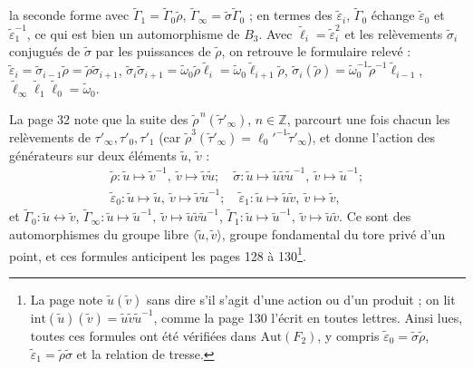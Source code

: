 \documentclass[11pt,a4paper]{article}
\begin{document}
la seconde forme avec $\tilde\Gamma_1 = \tilde\Gamma_0\tilde\rho$,
$\tilde\Gamma_\infty = \tilde\sigma\tilde\Gamma_0$ ; en termes des
$\tilde\varepsilon_i$, $\tilde\Gamma_0$ échange $\tilde\varepsilon_0$ et
$\tilde\varepsilon_1^{-1}$, ce qui est bien un automorphisme de $B_3$. Avec
$\tilde\ell_i = \tilde\varepsilon_i^2$ et les relèvements $\tilde\sigma_i$
conjugués de $\tilde\sigma$ par les puissances de $\tilde\rho$, on retrouve le
formulaire relevé :
$\tilde\varepsilon_i = \tilde\sigma_{i-1}\tilde\rho = \tilde\rho\tilde\sigma_{i+1}$,
$\tilde\sigma_i\tilde\sigma_{i+1} = \tilde\omega_0\tilde\rho\tilde\ell_i = \tilde\omega_0\tilde\ell_{i+1}\tilde\rho$,
$\tilde\sigma_i(\tilde\rho) = \tilde\omega_0^{-1}\tilde\rho^{-1}\tilde\ell_{i-1}$,
$\tilde\ell_\infty\tilde\ell_1\tilde\ell_0 = \tilde\omega_0$.

La page 32 note que la suite des $\tilde\rho^{\,n}(\tilde\tau'_\infty)$,
$n \in \mathbb{Z}$, parcourt une fois chacun les relèvements de
$\tau'_\infty, \tau'_0, \tau'_1$ (car $\tilde\rho^3(\tilde\tau'_\infty) = \ell_0'^{-1}\tilde\tau'_\infty$),
et donne l'action des générateurs sur deux éléments $\tilde u$, $\tilde v$ :
\[
\begin{gathered}
\tilde\rho : \tilde u \mapsto \tilde v^{-1},\ \tilde v \mapsto \tilde v\tilde u ; \quad
\tilde\sigma : \tilde u \mapsto \tilde u\tilde v\tilde u^{-1},\ \tilde v \mapsto \tilde u^{-1} ; \\
\tilde\varepsilon_0 : \tilde u \mapsto \tilde u,\ \tilde v \mapsto \tilde v\tilde u^{-1} ; \quad
\tilde\varepsilon_1 : \tilde u \mapsto \tilde u\tilde v,\ \tilde v \mapsto \tilde v,
\end{gathered}
\]
et $\tilde\Gamma_0 : \tilde u \leftrightarrow \tilde v$,
$\tilde\Gamma_\infty : \tilde u \mapsto \tilde u^{-1},\ \tilde v \mapsto \tilde u\tilde v\tilde u^{-1}$,
$\tilde\Gamma_1 : \tilde u \mapsto \tilde u^{-1},\ \tilde v \mapsto \tilde u\tilde v$.
Ce sont des automorphismes du groupe libre $\langle \tilde u, \tilde v \rangle$,
groupe fondamental du tore privé d'un point, et ces formules anticipent les
pages 128 à 130\footnote{La page note $\tilde u(\tilde v)$ sans dire s'il s'agit
d'une action ou d'un produit ; on lit
$\mathrm{int}(\tilde u)(\tilde v) = \tilde u\tilde v\tilde u^{-1}$, comme la
page 130 l'écrit en toutes lettres. Ainsi lues, toutes ces formules ont été
vérifiées dans $\mathrm{Aut}(F_2)$, y compris
$\tilde\varepsilon_0 = \tilde\sigma\tilde\rho$, $\tilde\varepsilon_1 = \tilde\rho\tilde\sigma$
et la relation de tresse.}.

\end{document}
